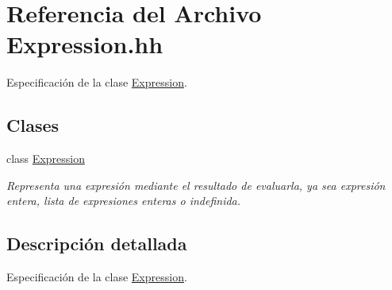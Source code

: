 \hypertarget{_expression_8hh}{}\section{Referencia del Archivo Expression.\+hh}
\label{_expression_8hh}


Especificación de la clase \hyperlink{class_expression}{Expression}.  


\subsection*{Clases}
\begin{DoxyCompactItemize}
\item 
class \hyperlink{class_expression}{Expression}
\begin{DoxyCompactList}\small\item\em Representa una expresión mediante el resultado de evaluarla, ya sea expresión entera, lista de expresiones enteras o indefinida. \end{DoxyCompactList}\end{DoxyCompactItemize}


\subsection{Descripción detallada}
Especificación de la clase \hyperlink{class_expression}{Expression}. 

